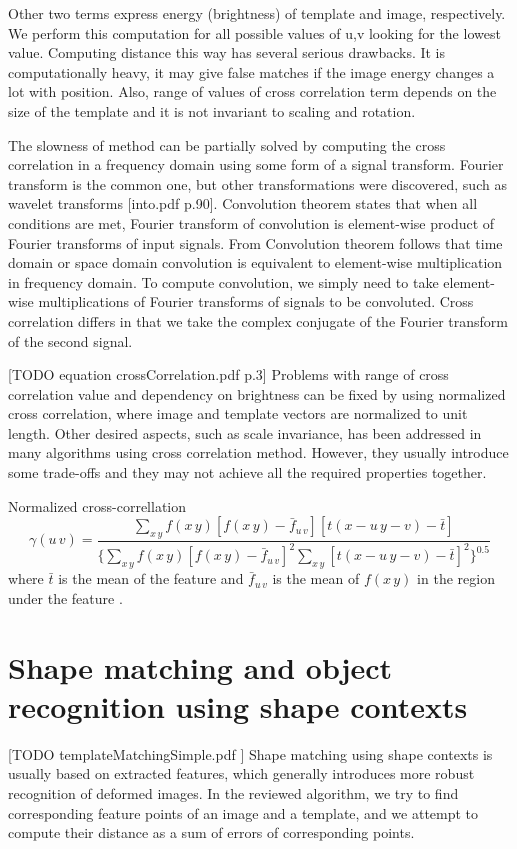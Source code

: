Other two terms express energy (brightness) of template and image, respectively. We perform this computation for all possible values of u,v looking for the lowest value. Computing distance this way has several serious drawbacks. It is computationally heavy, it may give false matches if the image energy changes a lot with position. Also, range of values of cross correlation term depends on the size of the template and it is not invariant to scaling and rotation. 

The slowness of method can be partially solved by computing the cross correlation in a frequency domain using some form of a signal transform. Fourier transform is the common one, but other transformations were discovered, such as wavelet transforms [into.pdf p.90]. Convolution theorem states that when all conditions are met, Fourier transform of convolution is element-wise product of Fourier transforms of input signals. From Convolution theorem follows that time domain or space domain convolution is equivalent to element-wise multiplication in frequency domain. To compute convolution, we simply need to take element-wise multiplications of Fourier transforms of signals to be convoluted. Cross correlation differs in that we take the complex conjugate of the Fourier transform of the second signal.

[TODO equation crossCorrelation.pdf p.3]
Problems with range of cross correlation value and dependency on brightness can be fixed by using normalized cross correlation, where image and template vectors are normalized to unit length. Other desired aspects, such as scale invariance, has been addressed in many algorithms using cross correlation method. However, they usually introduce some trade-offs and they may not achieve all the required properties together. 

Normalized cross-correllation
\begin{equation*}
\gamma(u\,v) = \frac{\sum_{x\,y}f(x\,y) [f(x\,y)-\bar{f}_{u\,v}][t(x-u\,y-v)-\bar{t}]} {\{ \sum_{x\,y}f(x\,y) [f(x\,y)-\bar{f}_{u\,v}]^2 \sum_{x\,y}[t(x-u\,y-v)-\bar{t}]^2  \}^{0.5}}
\end{equation*}
where $\bar{t}$ is the mean of the feature and $\bar{f}_{u\,v}$ is the mean of $f(x\,y)$ in the region under the feature \cite{crossCorrLewis}.

\section{Shape matching and object recognition using shape contexts}
[TODO templateMatchingSimple.pdf ]
Shape matching using shape contexts is usually based on extracted features, which generally introduces more robust recognition of deformed images. In the reviewed algorithm, we try to find corresponding feature points of an image and a template, and we attempt to compute their distance as a sum of errors of corresponding points.

